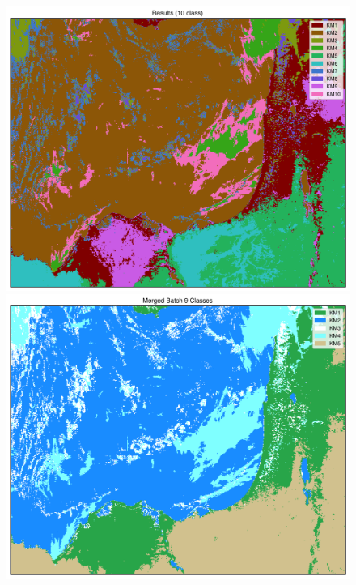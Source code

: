 \documentclass[12pt]{article}
\begin{document}
\begin{figure}[h!]
\begin{center}
{            \includegraphics[width=.4\paperwidth]{figs/class/kmeans_batch9c10_10c.png}

            \includegraphics[width=.4\paperwidth]{figs/class/kmeans_merged2_5c.png}
        }

        \makebox[\textwidth]{

}
\end{center}
\end{figure}
\end{document}
